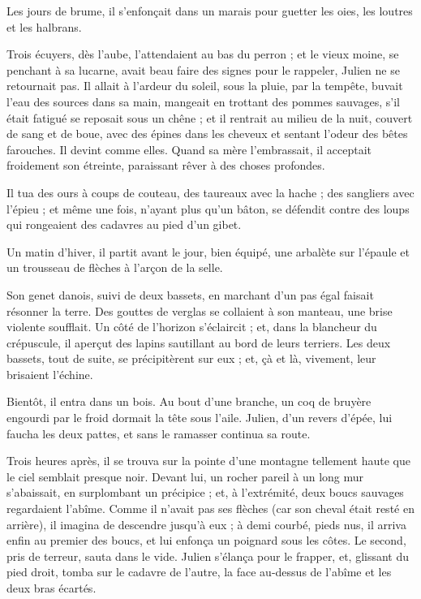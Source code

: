 \documentclass[]{book}
\begin{document}
                Les jours de brume, il s'enfonçait dans un marais pour guetter les oies, les loutres et les halbrans.
                    
                Trois écuyers, dès l'aube, l'attendaient au bas du perron ; et le vieux moine, se penchant à sa lucarne, avait beau faire des signes pour le rappeler, Julien ne se retournait pas. Il allait à l'ardeur du soleil, sous la pluie, par la tempête, buvait l'eau des sources dans sa main, mangeait en trottant des pommes sauvages, s'il était fatigué se reposait sous un chêne ; et il rentrait au milieu de la nuit, couvert de sang et de boue, avec des épines dans les cheveux et sentant l'odeur des bêtes farouches. Il devint comme elles. Quand sa mère l'embrassait, il acceptait froidement son étreinte, paraissant rêver à des choses profondes.
                    
                Il tua des ours à coups de couteau, des taureaux avec la hache ; des sangliers avec l'épieu ; et même une fois, n'ayant plus qu'un bâton, se défendit contre des loups qui rongeaient des cadavres au pied d'un gibet.
                    
                Un matin d'hiver, il partit avant le jour, bien équipé, une arbalète sur l'épaule et un trousseau de flèches à l'arçon de la selle.
                    
                Son genet danois, suivi de deux bassets, en marchant d'un pas égal faisait résonner la terre. Des gouttes de verglas se collaient à son manteau, une brise violente soufflait. Un côté de l'horizon s'éclaircit ; et, dans la blancheur du crépuscule, il aperçut des lapins sautillant au bord de leurs terriers. Les deux bassets, tout de suite, se précipitèrent sur eux ; et, çà et là, vivement, leur brisaient l'échine.
                    
                Bientôt, il entra dans un bois. Au bout d'une branche, un coq de bruyère engourdi par le froid dormait la tête sous l'aile. Julien, d'un revers d'épée, lui faucha les deux pattes, et sans le ramasser continua sa route.
                    
                Trois heures après, il se trouva sur la pointe d'une montagne tellement haute que le ciel semblait presque noir. Devant lui, un rocher pareil à un long mur s'abaissait, en surplombant un précipice ; et, à l'extrémité, deux boucs sauvages regardaient l'abîme. Comme il n'avait pas ses flèches (car son cheval était resté en arrière), il imagina de descendre jusqu'à eux ; à demi courbé, pieds nus, il arriva enfin au premier des boucs, et lui enfonça un poignard sous les côtes. Le second, pris de terreur, sauta dans le vide. Julien s'élança pour le frapper, et, glissant du pied droit, tomba sur le cadavre de l'autre, la face au-dessus de l'abîme et les deux bras écartés.
                    
\end{document}
